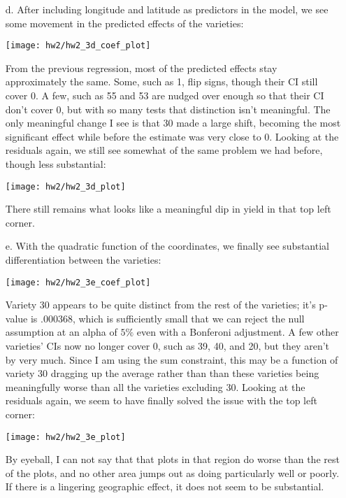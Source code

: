 \documentclass[11pt]{article}
\theoremstyle{definition}
\begin{document}
\begin{itemize}
    \item[d.]
        After including longitude and latitude as predictors in the model, we see some movement in the predicted effects of the varieties:
            \begin{center}
                \texttt{[image: hw2/hw2\_3d\_coef\_plot]}
            \end{center}
        From the previous regression, most of the predicted effects stay approximately the same. Some, such as 1, flip signs, though their CI still cover $0$. A few, such as 55 and 53 are nudged over enough so that their CI don't cover 0, but with so many tests that distinction isn't meaningful. The only meaningful change I see is that 30 made a large shift, becoming the most significant effect while before the estimate was very close to 0. Looking at the residuals again, we still see somewhat of the same problem we had before, though less substantial:
            \begin{center}
                \texttt{[image: hw2/hw2\_3d\_plot]}
            \end{center}
        There still remains what looks like a meaningful dip in yield in that top left corner.
    \item[e.]
        With the quadratic function of the coordinates, we finally see substantial differentiation between the varieties:
            \begin{center}
                \texttt{[image: hw2/hw2\_3e\_coef\_plot]}
            \end{center}
        Variety 30 appears to be quite distinct from the rest of the varieties; it's p-value is .000368, which is sufficiently small that we can reject the null assumption at an alpha of $5\%$ even with a Bonferoni adjustment.  A few other varieties' CIs now no longer cover 0, such as 39, 40, and 20, but they aren't by very much. Since I am using the sum constraint, this may be a function of variety 30 dragging up the average rather than than these varieties being meaningfully worse than all the varieties excluding 30. Looking at the residuals again, we seem to have finally solved the issue with the top left corner:
            \begin{center}
                \texttt{[image: hw2/hw2\_3e\_plot]}
            \end{center}
            By eyeball, I can not say that that plots in that region do worse than the rest of the plots, and no other area jumps out as doing particularly well or poorly. If there is a lingering geographic effect, it does not seem to be substantial.

\end{itemize}
\end{document}
